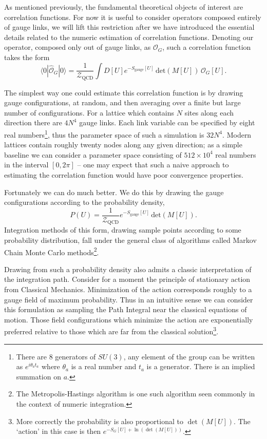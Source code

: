 As mentioned previously, the fundamental theoretical objects of interest are correlation functions. For now it is useful to consider operators composed entirely of gauge links, we will lift this restriction after we have introduced the essential details related to the numeric estimation of correlation functions. Denoting our operator, composed only out of gauge links, as $\mathcal{O}_G$, such a correlation function takes the form
\begin{equation*}
\langle 0 | \hat{\mathcal{O}}_G  | 0 \rangle =  \frac{1}{\mathcal{Z}_{\mathrm{QCD}}}\int D[U] e^{-S_{\mathrm{gauge}}[U]} \,\mathrm{det}(M[U]) \,\mathcal{O}_G[U]. 
\end{equation*}

The simplest way one could estimate this correlation function is by drawing gauge configurations, at random, and then averaging over a finite but large number of configurations. For a lattice which contains $N$ sites along each direction there are $4N^4$ gauge links. Each link variable can be specified by eight real numbers\footnote{There are 8 generators of $SU(3)$, any element of the group can be written as $e^{i\theta_a t_a}$ where $\theta_a$ is a real number and $t_a$ is a generator. There is an implied summation on $a$.}, thus the parameter space of such a simulation is $32N^4$. Modern lattices contain roughly twenty nodes along any given direction; as a simple baseline we can consider a parameter space consisting of $512\times 10^4$ real numbers in the interval $[0,2\pi]$ -- one may expect that such a naive approach to estimating the correlation function would have poor convergence properties. 

Fortunately we can do much better. We do this by drawing the gauge configurations according to the probability density, 
\begin{equation}\label{eqn::MC_prob_dens}
P(U) = \frac{1}{\mathcal{Z}_{\mathrm{QCD}}}e^{-S_{\mathrm{gauge}}[U]} \,\mathrm{det}(M[U]).
\end{equation}
Integration methods of this form, drawing sample points according to some probability distribution, fall under the general class of algorithms called Markov Chain Monte Carlo methods\footnote{The Metropolis-Hastings algorithm is one such algorithm seen commonly in the context of numeric integration.}. 

Drawing from such a probability density also admits a classic interpretation of the integration path. Consider for a moment the principle of stationary action from Classical Mechanics. Minimization of the action corresponds roughly to a gauge field of maximum probability. Thus in an intuitive sense we can consider this formulation as sampling the Path Integral near the classical equations of motion. Those field configurations which minimize the action are exponentially preferred relative to those which are far from the classical solution\footnote{More correctly the probability is also proportional to $\det(M[U])$. The `action' in this case is then $e^{-S_G[U] + \ln(\det(M[U]))}$.}. 

